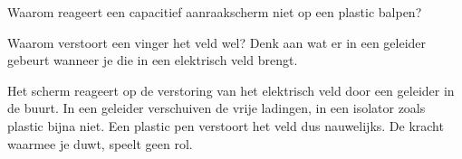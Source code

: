 \documentclass{ximera}
\begin{document}
\begin{question}
    Waarom reageert een capacitief aanraakscherm niet op een plastic balpen?

    \begin{multipleChoice}
    \end{multipleChoice}

    \begin{hint}
        Waarom verstoort een vinger het veld wel? Denk aan wat er in een geleider gebeurt wanneer je die in een elektrisch veld brengt.
    \end{hint}

    \begin{solution}\nl
        Het scherm reageert op de verstoring van het elektrisch veld door een geleider in de buurt. In een geleider verschuiven de vrije ladingen, in een isolator zoals plastic bijna niet. Een plastic pen verstoort het veld dus nauwelijks. De kracht waarmee je duwt, speelt geen rol.
    \end{solution}
\end{question}
\end{document}
